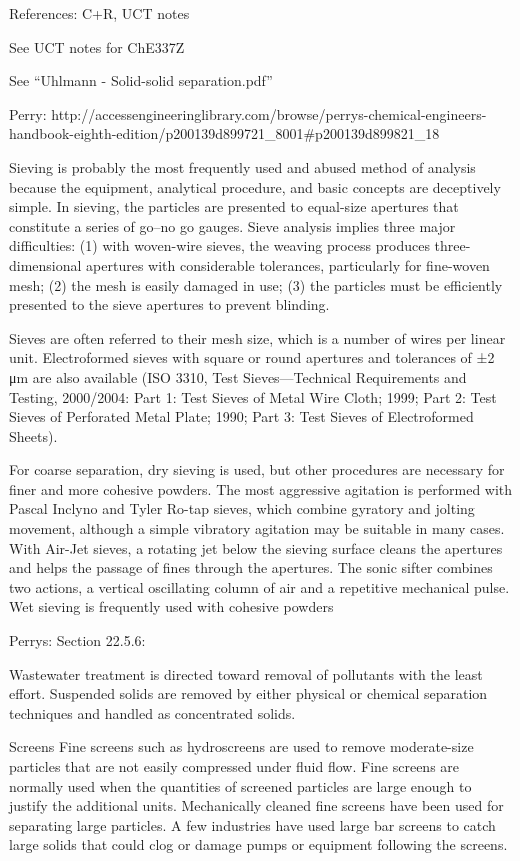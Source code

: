 References: C+R, UCT notes

See UCT notes for ChE337Z

See ``Uhlmann - Solid-solid separation.pdf''

Perry: http://accessengineeringlibrary.com/browse/perrys-chemical-engineers-handbook-eighth-edition/p200139d899721_8001#p200139d899821_18

Sieving is probably the most frequently used and abused method of analysis because the equipment, analytical procedure, and basic concepts are deceptively simple. In sieving, the particles are presented to equal-size apertures that constitute a series of go–no go gauges. Sieve analysis implies three major difficulties: (1) with woven-wire sieves, the weaving process produces three-dimensional apertures with considerable tolerances, particularly for fine-woven mesh; (2) the mesh is easily damaged in use; (3) the particles must be efficiently presented to the sieve apertures to prevent blinding.

Sieves are often referred to their mesh size, which is a number of wires per linear unit. Electroformed sieves with square or round apertures and tolerances of ±2 μm are also available (ISO 3310, Test Sieves—Technical Requirements and Testing, 2000/2004: Part 1: Test Sieves of Metal Wire Cloth; 1999; Part 2: Test Sieves of Perforated Metal Plate; 1990; Part 3: Test Sieves of Electroformed Sheets).

For coarse separation, dry sieving is used, but other procedures are necessary for finer and more cohesive powders. The most aggressive agitation is performed with Pascal Inclyno and Tyler Ro-tap sieves, which combine gyratory and jolting movement, although a simple vibratory agitation may be suitable in many cases. With Air-Jet sieves, a rotating jet below the sieving surface cleans the apertures and helps the passage of fines through the apertures. The sonic sifter combines two actions, a vertical oscillating column of air and a repetitive mechanical pulse. Wet sieving is frequently used with cohesive powders

Perrys: Section 22.5.6:

Wastewater treatment is directed toward removal of pollutants with the least effort. Suspended solids are removed by either physical or chemical separation techniques and handled as concentrated solids.

Screens Fine screens such as hydroscreens are used to remove moderate-size particles that are not easily compressed under fluid flow. Fine screens are normally used when the quantities of screened particles are large enough to justify the additional units. Mechanically cleaned fine screens have been used for separating large particles. A few industries have used large bar screens to catch large solids that could clog or damage pumps or equipment following the screens.

